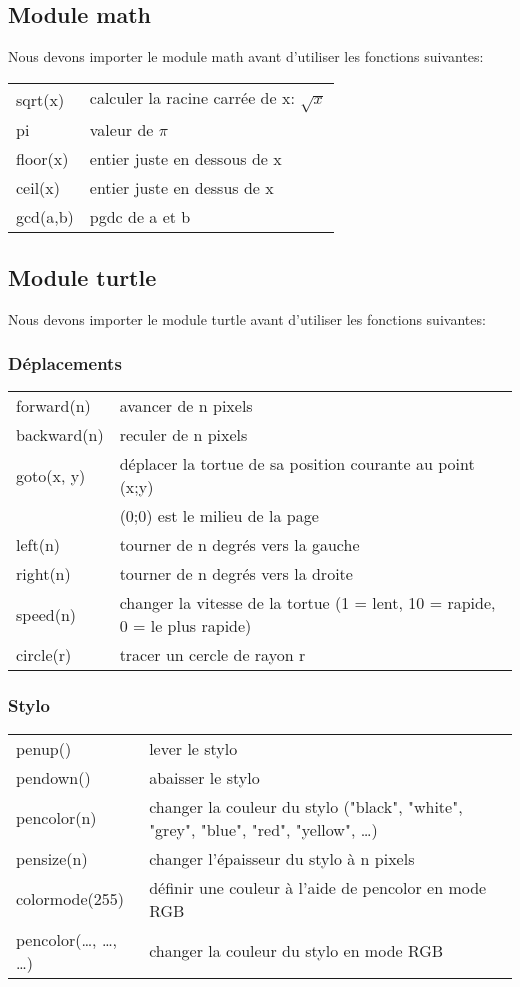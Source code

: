 \documentclass[a4paper,11pt]{article}
\begin{document}
\subsection{Module math}
Nous devons importer le module math avant d'utiliser les fonctions suivantes:\par
\begin{tabular}{l l}
sqrt(x) & calculer la racine carrée de x: $\sqrt{x}$\\
pi & valeur de $\pi$\\
floor(x) & entier juste en dessous de x\\
ceil(x) & entier juste en dessus de x\\
gcd(a,b) & pgdc de a et b\\
\end{tabular}

\subsection{Module turtle}
Nous devons importer le module turtle avant d'utiliser les fonctions suivantes:\par
\subsubsection{Déplacements}
\begin{tabular}{l l}
forward(n) & avancer de n pixels\\
backward(n) & reculer de n pixels\\
goto(x, y) & déplacer la tortue de sa position courante au point (x;y)\\
& (0;0) est le milieu de la page\\
left(n) & tourner de n degrés vers la gauche\\
right(n) & tourner de n degrés vers la droite\\
speed(n) & changer la vitesse de la tortue (1 = lent, 10 = rapide, 0 = le plus rapide)\\
circle(r) & tracer un cercle de rayon r\\
\end{tabular}


\subsubsection{Stylo}
\begin{tabular}{l l}
penup() & lever le stylo\\
pendown() & abaisser le stylo\\
pencolor(n) & changer la couleur du stylo ("black", "white", "grey", "blue",  "red", "yellow", …)\\
pensize(n)  & changer l'épaisseur du stylo à n pixels\\
colormode(255) & définir une couleur à l'aide de pencolor en mode RGB\\
pencolor(…, …, …) & changer la couleur du stylo en mode RGB \\
\end{tabular}
\end{document}
